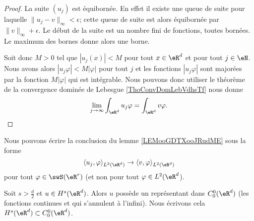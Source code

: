 \begin{proof}
    La suite \( (u_j)\) est équibornée. En effet il existe une queue de suite pour laquelle \( \| u_j-v \|_{\infty}<\epsilon\); cette queue de suite est alors équibornée par \( \| v \|_{\infty}+\epsilon\). Le début de la suite est un nombre fini de fonctions, toutes bornées. Le maximum des bornes donne alors une borne.

    Soit donc \( M>0\) tel que \( | u_j(x) |<M\) pour tout \( x\in \eR^d\) et pour tout \( j\in \eN\). Nous avons alors \( | u_j\varphi |<M| \varphi |\) pour tout \( j\) et les fonctions \(  | u_j\varphi | \) sont majorées par la fonction \( M| \varphi |\) qui est intégrable. Nous pouvons donc utiliser le théorème de la convergence dominée de Lebesgue \ref{ThoConvDomLebVdhsTf} nous donne
    \begin{equation}
        \lim_{j\to \infty} \int_{\eR^d} u_j\varphi=\int_{\eR^d}v\varphi.
    \end{equation}
\end{proof}

Nous pouvons écrire la conclusion du lemme \ref{LEMooGDTXooJRudME} sous la forme
\begin{equation}
    \langle u_j, \varphi\rangle_{L^2(\eR^d)}\to \langle v, \varphi\rangle_{L^2(\eR^d)}
\end{equation}
pour tout \( \varphi\in \swS(\eR^r)\) (et non pour tout \( \varphi\in L^2(\eR^d\)).

\begin{theorem}[Théorème de Sobolev avec \( k=0\)\cite{ooFZERooPVhoge}]     \label{THOooOHIPooXSEkVI}
    Soit \( s>\frac{ d }{ 2 }\) et \( u\in H^s(\eR^d)\). Alors \( u\) possède un représentant dans \( C^0_0(\eR^d)\) (les fonctions continues et qui s'annulent à l'infini). Nous écrivons cela \( H^s(\eR^d)\subset C_0^0(\eR^d)\).
\end{theorem}

